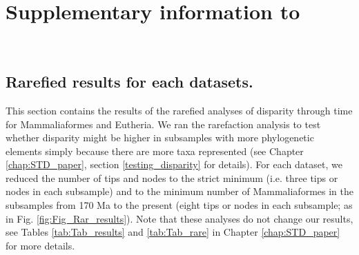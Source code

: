 \chapter{Supplementary information to }
\label{chap:Appendix_STD}

\bigskip
\medskip
\begin{center}

 \\
\bigskip
\end{center}

\section{Rarefied results for each datasets.}
This section contains the results of the rarefied analyses of disparity through time for Mammaliaformes and Eutheria.
We ran the rarefaction analysis to test whether disparity might be higher in subsamples with more phylogenetic elements simply because there are more taxa represented (see Chapter \ref{chap:STD_paper}, section \ref{testing_disparity} for details).
For each dataset, we reduced the number of tips and nodes to the strict minimum (i.e. three tips or nodes in each subsample) and to the minimum number of Mammaliaformes in the subsamples from 170 Ma to the present (eight tips or nodes in each subsample; as in Fig. \ref{fig:Fig_Rar_results}).
Note that these analyses do not change our results, see Tables \ref{tab:Tab_results} and \ref{tab:Tab_rare} in Chapter \ref{chap:STD_paper} for more details.

